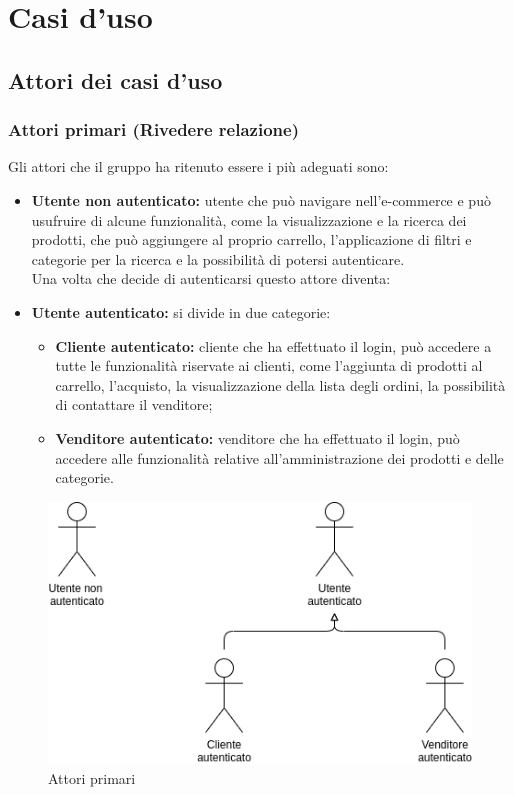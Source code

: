\section{Casi d'uso}
\subsection{Attori dei casi d'uso}
\subsubsection{Attori primari (\textbf{Rivedere relazione})}
Gli attori che il gruppo ha ritenuto essere i più adeguati sono:
\begin{itemize}
    \item \textbf{Utente non autenticato:} utente che può navigare nell'e-commerce e può usufruire di alcune funzionalità, come la visualizzazione e la ricerca dei prodotti, che può aggiungere al proprio carrello, l'applicazione di filtri e categorie per la ricerca e la possibilità di potersi autenticare.\\
    Una volta che decide di autenticarsi questo attore diventa:
    \item \textbf{Utente autenticato:} si divide in due categorie:
        \begin{itemize}
            \item \textbf{Cliente autenticato:} cliente che ha effettuato il login, può accedere a tutte le funzionalità riservate ai clienti, come l'aggiunta di prodotti al carrello, l'acquisto, la visualizzazione della lista degli ordini, la possibilità di contattare il venditore;
            \item \textbf{Venditore autenticato:} venditore che ha effettuato il login, può accedere alle funzionalità relative all'amministrazione dei prodotti e delle categorie.
        \end{itemize}
\end{itemize}
\begin{figure}[!ht]
    \caption{Attori primari}
    \vspace{10px}
    \includegraphics[scale=0.6]{../../../Images/AnalisiRequisiti/attori}
    \centering
\end{figure}
